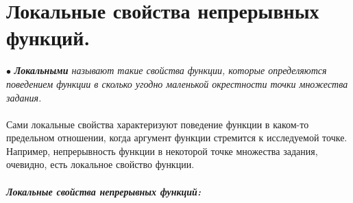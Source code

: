 \section{Локальные свойства непрерывных функций.}
$\bullet$ \textit{\textbf{Локальными} называют такие свойства функции, которые определяются поведением функции в сколько угодно маленькой окрестности точки множества задания.}\\\\
Сами локальные свойства характеризуют поведение функции в каком-то предельном отношении, когда аргумент функции стремится к исследуемой точке. Например, непрерывность функции в некоторой точке множества задания, очевидно, есть локальное свойство функции.\\\\
\textbf{\textit{Локальные свойства непрерывных функций:}}
